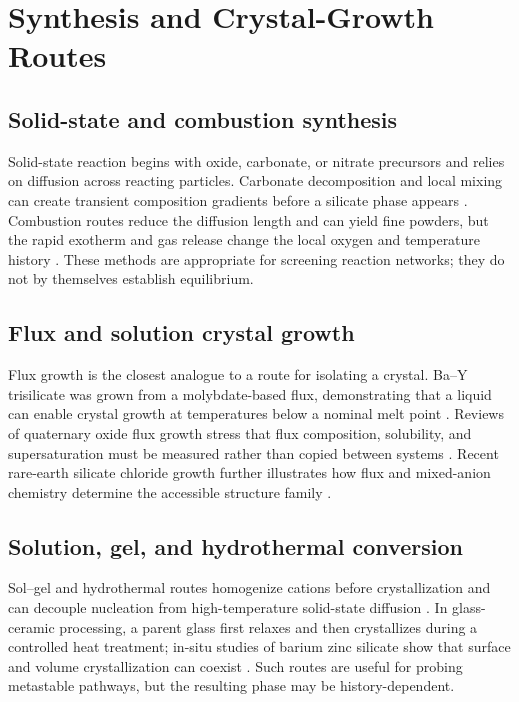 \section{Synthesis and Crystal-Growth Routes}

\subsection{Solid-state and combustion synthesis}

Solid-state reaction begins with oxide, carbonate, or nitrate precursors and relies on diffusion across reacting particles. Carbonate decomposition and local mixing can create transient composition gradients before a silicate phase appears \cite{cultrone2001carbonate,takesue2009thermal,shen2019synthesis}. Combustion routes reduce the diffusion length and can yield fine powders, but the rapid exotherm and gas release change the local oxygen and temperature history \cite{rakov2011near,gupta2021combustion,richhariya2021synthesis}. These methods are appropriate for screening reaction networks; they do not by themselves establish equilibrium.

\subsection{Flux and solution crystal growth}

Flux growth is the closest analogue to a route for isolating a crystal. Ba--Y trisilicate was grown from a molybdate-based flux, demonstrating that a liquid can enable crystal growth at temperatures below a nominal melt point \cite{kolitsch2006bay2si3o10}. Reviews of quaternary oxide flux growth stress that flux composition, solubility, and supersaturation must be measured rather than copied between systems \cite{bugaris2012materials,kumar1974growth,smith1974flux,wanklyn1983supersaturation}. Recent rare-earth silicate chloride growth further illustrates how flux and mixed-anion chemistry determine the accessible structure family \cite{goncalves2025flux}.

\subsection{Solution, gel, and hydrothermal conversion}

Sol--gel and hydrothermal routes homogenize cations before crystallization and can decouple nucleation from high-temperature solid-state diffusion \cite{ranganathan2008sol,parsa2018synthesis,peng2016hydrothermal,ranganathan2008sol}. In glass-ceramic processing, a parent glass first relaxes and then crystallizes during a controlled heat treatment; in-situ studies of barium zinc silicate show that surface and volume crystallization can coexist \cite{bocker2012in,bai2020kinetic,waurischk2020crystal}. Such routes are useful for probing metastable pathways, but the resulting phase may be history-dependent.

